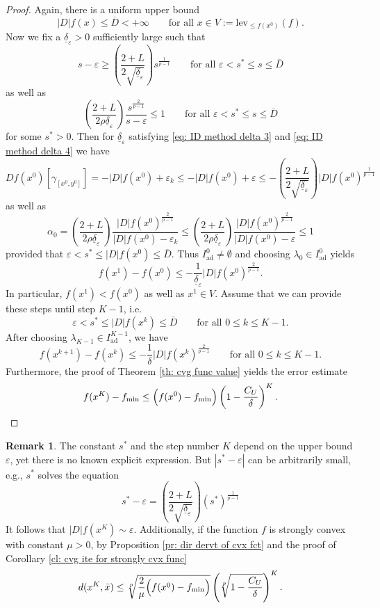 \documentclass{article}
\theoremstyle{plain}\newtheorem{theorem}{Theorem}[section]
\theoremstyle{plain}\newtheorem{definition}[theorem]{Definition}
\theoremstyle{plain}\newtheorem{lemma}[theorem]{Lemma}
\theoremstyle{definition}\newtheorem{remark}[theorem]{Remark}
\theoremstyle{definition}\newtheorem{example}[theorem]{Example}
\theoremstyle{plain}\newtheorem{proposition}[theorem]{Proposition}
\theoremstyle{plain}\newtheorem{inference}[theorem]{Inference}
\theoremstyle{plain}\newtheorem{corollary}[theorem]{Corollary}
\theoremstyle{plain}\newtheorem{assumption}[theorem]{Assumption}
\begin{document}
\begin{proof}
    Again, there is a uniform upper bound
    $$
    |D|f(x)\leq\overline{D}<+\infty \qquad\text{for all}\,\,x\in V:=\mathrm{lev}_{\leq f(x^0)}(f).
    $$
    Now we fix a $\underline{\delta}_\varepsilon>0$ sufficiently large such that
    \begin{equation}\label{eq: ID method delta 3}
        s-\varepsilon\geq\left(\frac{2+L}{2\sqrt{\underline{\delta}_\varepsilon}}\right)s^{\frac{1}{p-1}} \qquad\text{for all}\,\,\varepsilon<s^*\leq s\leq\overline{D}
    \end{equation}
    as well as
    \begin{equation}\label{eq: ID method delta 4}
        \left(\frac{2+L}{2\rho\underline{\delta}_\varepsilon}\right)\frac{s^{\frac{2}{p-1}}}{s-\varepsilon}\leq 1 \qquad\text{for all}\,\,\varepsilon<s^*\leq s\leq\overline{D}
    \end{equation}
    for some $s^*>0$.
    Then for $\underline{\delta}_\varepsilon$ satisfying \eqref{eq: ID method delta 3} and \eqref{eq: ID method delta 4} we have
    $$
    Df(x^0)[\gamma_{[x^0,y^0]}]=-|D|f(x^0)+\varepsilon_k\leq-|D|f(x^0)+\varepsilon\leq-\left(\frac{2+L}{2\sqrt{\underline{\delta}_\varepsilon}}\right)|D|f(x^0)^{\frac{1}{p-1}}
    $$
    as well as
    $$
    \alpha_0=\left(\frac{2+L}{2\rho\underline{\delta}_\varepsilon}\right)\frac{|D|f(x^0)^{\frac{2}{p-1}}}{|D|f(x^0)-\varepsilon_k}\leq\left(\frac{2+L}{2\rho\underline{\delta}_\varepsilon}\right)\frac{|D|f(x^0)^{\frac{2}{p-1}}}{|D|f(x^0)-\varepsilon}\leq 1
    $$
    provided that $\varepsilon<s^*\leq|D|f(x^0)\leq\overline{D}$. Thus $I_{\mathrm{ad}}^0\neq\emptyset$ and choosing $\lambda_0\in I_{\mathrm{ad}}^0$ yields
    $$
    f(x^1)-f(x^0)\leq-\frac{1}{\underline{\delta}_\varepsilon}|D|f(x^0)^{\frac{2}{p-1}}.
    $$
    In particular,  $f(x^1)<f(x^0)$ as well as $x^1\in V$. Assume that we can provide these steps until step $K-1$, i.e.
    $$
    \varepsilon<s^*\leq|D|f(x^k)\leq\overline{D} \qquad\text{for all}\,\,0\leq k\leq K-1.
    $$
    After choosing $\lambda_{K-1}\in I_{\mathrm{ad}}^{K-1}$, we have
    $$
    f(x^{k+1})-f(x^k)\leq-\frac{1}{\delta}|D|f(x^k)^{\frac{2}{p-1}} \qquad \text{for all}\,\,0\leq k\leq K-1.
    $$
    Furthermore, the proof of Theorem \ref{th: cvg func value} yields the error estimate
    $$
    f(x^K)-f_{\min}\leq\Bigl(f(x^0)-f_{\min}\Bigr)\left(1-\frac{C_U}{\delta}\right)^K.
    $$
\end{proof}
\begin{remark}
    The constant $s^*$ and the step number $K$ depend on the upper bound $\varepsilon$, yet there is no known explicit expression. But $|s^*-\varepsilon|$ can be arbitrarily small, e.g., $s^*$ solves the equation
    $$
    s^*-\varepsilon=\left(\frac{2+L}{2\sqrt{\underline{\delta}_\varepsilon}}\right)(s^*)^{\frac{1}{p-1}}
    $$
    It follows that $|D|f(x^K)\sim\varepsilon$. Additionally, if the function $f$ is strongly convex with constant $\mu>0$,
    by Proposition \ref{pr: dir dervt of cvx fct} and the proof of Corollary \ref{cl: cvg ite for strongly cvx func}
    $$
    d(x^K,\bar{x})\leq\sqrt[p]{\frac{2}{\mu}\Bigl(f(x^0)-f_{\min}\Bigr)}\left(\sqrt[p]{1-\frac{C_U}{\delta}}\right)^{K}.
    $$
\end{remark}
\end{document}
